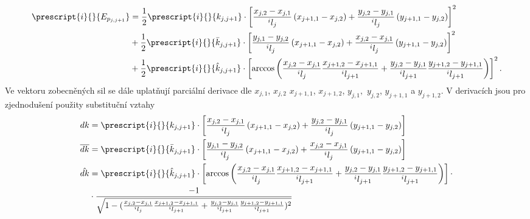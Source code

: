 \begin{align}
	\prescript{i}{}{E_{p _{j,j+1}}}&= \frac{1}{2} \prescript{i}{}{k_{j,j+1}}\cdot \left[	\frac{x_{j,2}-x_{j,1}}{^il_j} \left( x_{j+1,1} - x_{j,2} \right) + \dfrac{y_{j,2} - y_{j,1}}{^il_j} \left( y_{j+1,1} -y_{j,2} \right)  \right]^2  \notag\\&+\frac{1}{2} \prescript{i}{}{\bar{k}_{j,j+1}}\cdot \left[ 	\frac{y_{j,1}-y_{j,2}}{^il_j} \left( x_{j+1,1} - x_{j,2} \right)  + \frac{x_{j,2}-x_{j,1}}{^il_j} \left( y_{j+1,1} - y_{j,2} \right) 			\right]^2  \notag\\&+\frac{1}{2} \prescript{i}{}{\hat{k}_{j,j+1}}\cdot \left[  \arccos \left( \frac{x_{j,2} - x_{j,1}}{^il_j} \frac{x_{j+1,2} - x_{j+1,1}}{^il_{j+1}} + \frac{y_{j,2}-y_{j,1}}{^il_{j+1}} \frac{y_{j+1,2} - y_{j+1,1}}{^il_{j+1}}	\right)	\right]^2 .
\end{align}
Ve vektoru zobecněných sil se dále uplatňují parciální derivace dle $ x_{j,1} $, $ x_{j,2} $ $ x_{j+1,1} $, $ x_{j+1,2} $, $ y_{j,1}, $ $ y_{j,2} $, $ y_{j+1,1} $ a $ y_{j+1,2}$. V derivacích jsou pro zjednodušení použity substituční vztahy
\begin{align}
	dk &= \prescript{i}{}{k_{j,j+1}}\cdot \left[	\frac{x_{j,2}-x_{j,1}}{^il_j} \left( x_{j+1,1} - x_{j,2} \right) + \dfrac{y_{j,2} - y_{j,1}}{^il_j} \left( y_{j+1,1} -y_{j,2} \right)  \right] \\
	\overline{dk} &= \prescript{i}{}{\bar{k}_{j,j+1}} \cdot \left[ 	\frac{y_{j,1}-y_{j,2}}{^il_j} \left( x_{j+1,1} - x_{j,2} \right)  + \frac{x_{j,2}-x_{j,1}}{^il_j} \left( y_{j+1,1} - y_{j,2} \right) 			\right]\\
	\hat{dk}&=\prescript{i}{}{\hat{k}_{j,j+1}}\cdot \left[  \arccos \left( \frac{x_{j,2} - x_{j,1}}{^il_j} \frac{x_{j+1,2} - x_{j+1,1}}{^il_{j+1}} + \frac{y_{j,2}-y_{j,1}}{^il_{j+1}} \frac{y_{j+1,2} - y_{j+1,1}}{^il_{j+1}}	\right)	\right] \cdot \notag\\
	&\cdot \frac{-1}{\sqrt{1-(\frac{x_{j,2} - x_{j,1}}{^il_j} \frac{x_{j+1,2} - x_{j+1,1}}{^il_{j+1}} + \frac{y_{j,2}-y_{j,1}}{^il_{j+1}} \frac{y_{j+1,2} - y_{j+1,1}}{^il_{j+1}})^2}}
\end{align}

